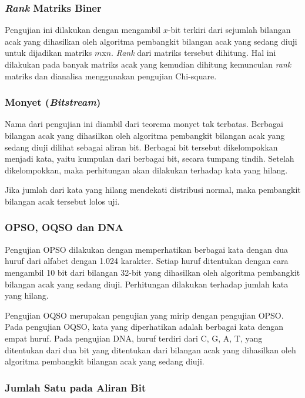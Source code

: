 \documentclass[conference]{IEEEtran}
\newcommand{\en}[1]
    {\foreignlanguage{english}{\textit{#1}}}
\begin{document}
\subsubsection{\en{Rank} Matriks Biner}

Pengujian ini dilakukan dengan mengambil $x$-bit terkiri dari sejumlah bilangan acak yang dihasilkan oleh algoritma pembangkit bilangan acak yang sedang diuji untuk dijadikan matriks $m$x$n$.
\en{Rank} dari matriks tersebut dihitung.
Hal ini dilakukan pada banyak matriks acak yang kemudian dihitung kemunculan \en{rank} matriks dan dianalisa menggunakan pengujian Chi-square.

\subsubsection{Monyet (\en{Bitstream})}

Nama dari pengujian ini diambil dari teorema monyet tak terbatas.
Berbagai bilangan acak yang dihasilkan oleh algoritma pembangkit bilangan acak yang sedang diuji dilihat sebagai aliran bit.
Berbagai bit tersebut dikelompokkan menjadi kata, yaitu kumpulan dari berbagai bit, secara tumpang tindih.
Setelah dikelompokkan, maka perhitungan akan dilakukan terhadap kata yang hilang.

Jika jumlah dari kata yang hilang mendekati distribusi normal, maka pembangkit bilangan acak tersebut lolos uji.

\subsubsection{OPSO, OQSO dan DNA}

Pengujian OPSO dilakukan dengan memperhatikan berbagai kata dengan dua huruf dari alfabet dengan 1.024 karakter.
Setiap huruf ditentukan dengan cara mengambil 10 bit dari bilangan 32-bit yang dihasilkan oleh algoritma pembangkit bilangan acak yang sedang diuji.
Perhitungan dilakukan terhadap jumlah kata yang hilang.

Pengujian OQSO merupakan pengujian yang mirip dengan pengujian OPSO.
Pada pengujian OQSO, kata yang diperhatikan adalah berbagai kata dengan empat huruf.
Pada pengujian DNA, huruf terdiri dari C, G, A, T, yang ditentukan dari dua bit yang ditentukan dari bilangan acak yang dihasilkan oleh algoritma pembangkit bilangan acak yang sedang diuji.

\subsubsection{Jumlah Satu pada Aliran Bit}
\label{sec:teori:diehard:count1stream}
\end{document}
